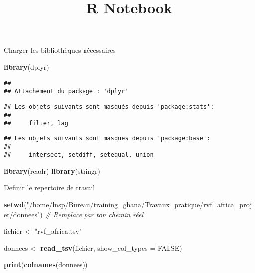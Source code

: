 \documentclass[
]{article}
\title{R Notebook}
\author{}
\date{\vspace{-2.5em}}
\newenvironment{Shaded}{\begin{snugshade}}{\end{snugshade}}
\newcommand{\AttributeTok}[1]{\textcolor[rgb]{0.13,0.29,0.53}{#1}}
\newcommand{\CommentTok}[1]{\textcolor[rgb]{0.56,0.35,0.01}{\textit{#1}}}
\newcommand{\ConstantTok}[1]{\textcolor[rgb]{0.56,0.35,0.01}{#1}}
\newcommand{\FunctionTok}[1]{\textcolor[rgb]{0.13,0.29,0.53}{\textbf{#1}}}
\newcommand{\NormalTok}[1]{#1}
\newcommand{\OtherTok}[1]{\textcolor[rgb]{0.56,0.35,0.01}{#1}}
\newcommand{\StringTok}[1]{\textcolor[rgb]{0.31,0.60,0.02}{#1}}
\begin{document}
\maketitle

Charger les bibliothèques nécessaires

\begin{Shaded}
\begin{Highlighting}[]
\FunctionTok{library}\NormalTok{(dplyr)}
\end{Highlighting}
\end{Shaded}

\begin{verbatim}
## 
## Attachement du package : 'dplyr'
\end{verbatim}

\begin{verbatim}
## Les objets suivants sont masqués depuis 'package:stats':
## 
##     filter, lag
\end{verbatim}

\begin{verbatim}
## Les objets suivants sont masqués depuis 'package:base':
## 
##     intersect, setdiff, setequal, union
\end{verbatim}

\begin{Shaded}
\begin{Highlighting}[]
\FunctionTok{library}\NormalTok{(readr)}
\FunctionTok{library}\NormalTok{(stringr)}
\end{Highlighting}
\end{Shaded}

Definir le repertoire de travail

\begin{Shaded}
\begin{Highlighting}[]
\FunctionTok{setwd}\NormalTok{(}\StringTok{"/home/lnsp/Bureau/training\_ghana/Travaux\_pratique/rvf\_africa\_projet/donnees"}\NormalTok{)  }\CommentTok{\# Remplace par ton chemin réel}

\NormalTok{fichier }\OtherTok{\textless{}{-}} \StringTok{"rvf\_africa.tsv"}

\NormalTok{donnees }\OtherTok{\textless{}{-}} \FunctionTok{read\_tsv}\NormalTok{(fichier, }\AttributeTok{show\_col\_types =} \ConstantTok{FALSE}\NormalTok{)}

\FunctionTok{print}\NormalTok{(}\FunctionTok{colnames}\NormalTok{(donnees))}
\end{Highlighting}
\end{Shaded}
\end{document}

